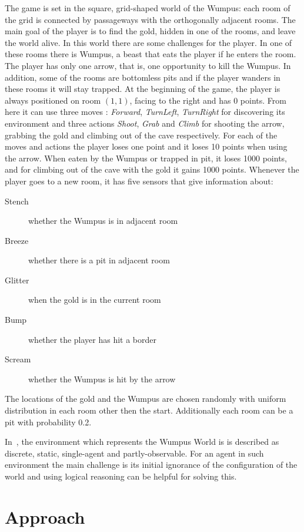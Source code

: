 \documentclass{llncs}
\begin{document}
The game is set in the square, grid-shaped world of the Wumpus: each room of the grid is connected by passageways with the orthogonally adjacent rooms.
The main goal of the player is to find the gold, hidden in one of the rooms, and leave the world alive. 
In this world there are some challenges for the player.
In one of these rooms there is Wumpus, a beast that eats the player if he enters the room. The player has only one arrow, that is, one opportunity to kill the Wumpus. In addition, some of the rooms are bottomless pits and if the player wanders in these rooms it will stay trapped. At the beginning of the game, the player is always positioned on room $(1,1)$, facing to the right and has $0$ points. From here it can use three moves : \emph{Forward}, \emph{TurnLeft}, \emph{TurnRight} for discovering its environment and three actions \emph{Shoot}, \emph{Grab} and \emph{Climb} for shooting the arrow, grabbing the gold and climbing out of the cave respectively. For each of the moves and actions the player loses one point and it loses 10 points when using the arrow. When eaten by the Wumpus or trapped in pit, it loses 1000 points, and for climbing out of the cave with the gold it gains 1000 points. Whenever the player goes to a new room, it has five sensors that give information about:
\begin{description}
	\item[Stench]{whether the Wumpus is in adjacent room}
	\item[Breeze]{whether there is a pit in adjacent room}
	\item[Glitter]{when the gold is in the current room}
	\item[Bump]{whether the player has hit a border}
	\item[Scream]{whether the Wumpus is hit by the arrow}
\end{description}
The locations of the gold and the Wumpus are chosen randomly with uniform distribution in each room other then the start. Additionally each room can be a pit with probability 0.2.

In~\cite{book:aima}, the environment which represents the Wumpus World is is described as discrete, static, single-agent and partly-observable. For an agent in such environment the main challenge is its initial ignorance of the configuration of the world and using logical reasoning can be helpful for solving this. 

\section{Approach}
\end{document}
